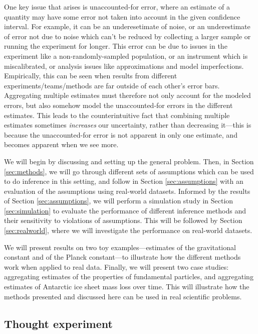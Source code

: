 \documentclass[letterpaper,12pt]{article}
\begin{document}
One key issue that arises is unaccounted-for error, where an estimate of a quantity may have some error not taken into account in the given confidence interval. For example, it can be an underesetimate of noise, or an underestimate of error not due to noise which can't be reduced by collecting a larger sample or running the experiment for longer. This error can be due to issues in the experiment like a non-randomly-sampled population, or an instrument which is miscalibrated, or analysis issues like approximations and model imperfections. Empirically, this can be seen when results from different experiments/teams/methods are far outside of each other's error bars. Aggregating multiple estimates must therefore not only account for the modeled errors, but also somehow model the unaccounted-for errors in the different estimates. This leads to the counterintuitive fact that combining multiple estimates sometimes \emph{increases} our uncertainty, rather than decreasing it---this is because the unaccounted-for error is not apparent in only one estimate, and becomes apparent when we see more.

We will begin by discussing and setting up the general problem. Then, in Section \ref{sec:methods}, we will go through different sets of assumptions which can be used to do inference in this setting, and follow in Section \ref{sec:assumptions} with an evaluation of the assumptions using real-world datasets. Informed by the results of Section \ref{sec:assumptions}, we will perform a simulation study in Section \ref{sec:simulation} to evaluate the performance of different inference methods and their sensitivity to violations of assumptions. This will be followed by Section \ref{sec:realworld}, where we will investigate the performance on real-world datasets.

We will present results on two toy examples---estimates of the gravitational constant and of the Planck constant---to illustrate how the different methods work when applied to real data. Finally, we will present two case studies: aggregating estimates of the properties of fundamental particles, and aggregating estimates of Antarctic ice sheet mass loss over time. This will illustrate how the methods presented and discussed here can be used in real scientific problems.

\subsection{Thought experiment}\label{thought-experiment}
\end{document}
